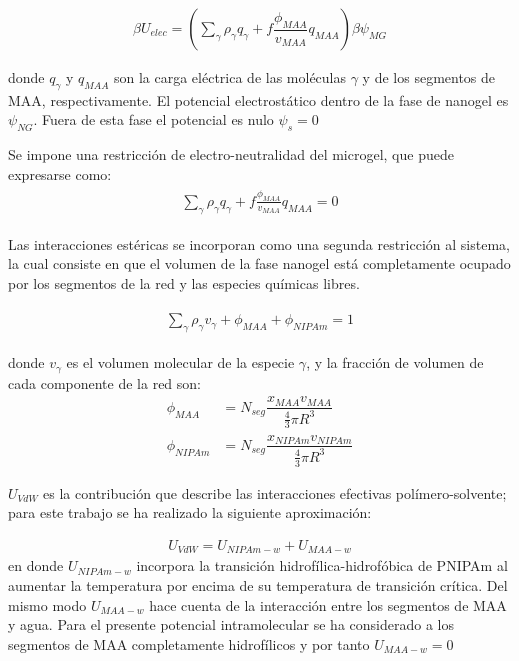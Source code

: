 	\begin{align}
		\beta U_{elec} =\left(\sum_{\gamma } {\rho_\gamma q_\gamma + f\dfrac{\phi_{MAA}}{v_{MAA}}q_{MAA}}\right)\beta\psi_{MG}
	\end{align}
	
	\noindent donde $q_\gamma$ y $q_{MAA}$ son la carga el\'ectrica de las moléculas $\gamma$ y de los segmentos de MAA, respectivamente.
	El potencial electrost\'atico dentro de la fase de nanogel es $\psi_{NG}$. Fuera de esta fase el potencial es nulo $\psi_s = 0$
	
	Se impone una restricci\'on de electro-neutralidad del microgel, que puede expresarse como:
	\begin{align}
		\begin{aligned}
			\sum_{\gamma  } \rho_\gamma q_\gamma + f\frac{\phi_{MAA}}{v_{MAA}}q_{MAA}=0
		\end{aligned}
		\label{eq:mc:charge-neutrality}
	\end{align}
	
	Las interacciones est\'ericas se incorporan como una segunda restricci\'on al sistema, la cual consiste en que el volumen de la fase nanogel est\'a completamente ocupado por los segmentos de la red y las especies qu\'imicas libres.
	
	\begin{align}
		\begin{aligned}
			\sum_{\gamma } \rho_\gamma v_\gamma  + \phi_{MAA} + \phi_{NIPAm} = 1
		\end{aligned}
		\label{eq:mc:packing}
	\end{align}
	
	
	\noindent donde $v_\gamma$  es el volumen molecular de la especie $\gamma$, y la fracci\'on de volumen de cada componente de la red son: 
	\begin{align}
		\phi_{MAA}&=N_{seg}\dfrac{x_{MAA}v_{MAA}}{\frac{4}{3}\pi R^3}\\
		\phi_{NIPAm}&=N_{seg}\dfrac{x_{NIPAm}v_{NIPAm}}{\frac{4}{3}\pi R^3}
	\end{align}
	
	
	
	$U_{VdW}$ es la contribuci\'on que describe las interacciones efectivas pol\'imero-solvente; para este trabajo  se ha realizado la siguiente aproximaci\'on: 
	
	\begin{align}
		U_{VdW} = U_{NIPAm-w} + U_{MAA-w}
	\end{align}
	\noindent en donde $U_{NIPAm-w}$ incorpora la transici\'on hidrof\'ilica-hidrof\'obica de PNIPAm al aumentar la temperatura por encima de su temperatura de transici\'on cr\'itica. 
	Del mismo modo $U_{MAA-w}$ hace cuenta de la interacci\'on entre los segmentos de MAA y agua.
	Para el presente potencial intramolecular se ha considerado a los segmentos de MAA completamente hidrof\'ilicos y por tanto $U_{MAA-w} = 0$
	
